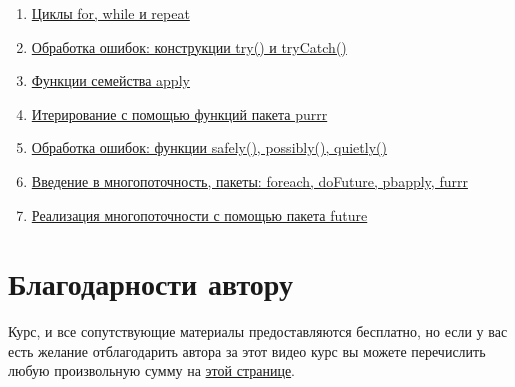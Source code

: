 \documentclass[
]{book}
\providecommand{\tightlist}{%
  \setlength{\itemsep}{0pt}\setlength{\parskip}{0pt}}
\begin{document}
\begin{enumerate}
\def\labelenumi{\arabic{enumi}.}
\tightlist
\item
  \href{\%D1\%86\%D0\%B8\%D0\%BA\%D0\%BB\%D1\%8B-for-while-\%D0\%B8-repeat.html\#\%D1\%86\%D0\%B8\%D0\%BA\%D0\%BB\%D1\%8B-for-while-\%D0\%B8-repeat}{Циклы for, while и repeat}
\item
  \href{обработка-ошибок-конструкции-try-и-trycatch.html}{Обработка ошибок: конструкции try() и tryCatch()}
\item
  \href{\%D1\%84\%D1\%83\%D0\%BD\%D0\%BA\%D1\%86\%D0\%B8\%D0\%B8-\%D1\%81\%D0\%B5\%D0\%BC\%D0\%B5\%D0\%B9\%D1\%81\%D1\%82\%D0\%B2\%D0\%B0-apply.html\#\%D1\%84\%D1\%83\%D0\%BD\%D0\%BA\%D1\%86\%D0\%B8\%D0\%B8-\%D1\%81\%D0\%B5\%D0\%BC\%D0\%B5\%D0\%B9\%D1\%81\%D1\%82\%D0\%B2\%D0\%B0-apply}{Функции семейства apply}
\item
  \href{\%D0\%BF\%D0\%B0\%D0\%BA\%D0\%B5\%D1\%82-purrr.html\#\%D0\%BF\%D0\%B0\%D0\%BA\%D0\%B5\%D1\%82-purrr}{Итерирование с помощью функций пакета purrr}
\item
  \href{обработка-ошибок-функции-safely-possibly-quietly.html}{Обработка ошибок: функции safely(), possibly(), quietly()}
\item
  \href{\%D0\%BC\%D0\%BD\%D0\%BE\%D0\%B3\%D0\%BE\%D0\%BF\%D0\%BE\%D1\%82\%D0\%BE\%D1\%87\%D0\%BD\%D0\%BE\%D1\%81\%D1\%82\%D1\%8C-\%D0\%B2-r.html\#\%D0\%BC\%D0\%BD\%D0\%BE\%D0\%B3\%D0\%BE\%D0\%BF\%D0\%BE\%D1\%82\%D0\%BE\%D1\%87\%D0\%BD\%D0\%BE\%D1\%81\%D1\%82\%D1\%8C-\%D0\%B2-r}{Введение в многопоточность, пакеты: foreach, doFuture, pbapply, furrr}
\item
  \href{\%D0\%BF\%D0\%B0\%D0\%BA\%D0\%B5\%D1\%82-future.html\#\%D0\%BF\%D0\%B0\%D0\%BA\%D0\%B5\%D1\%82-future}{Реализация многопоточности с помощью пакета future}
\end{enumerate}

\hypertarget{ux431ux43bux430ux433ux43eux434ux430ux440ux43dux43eux441ux442ux438-ux430ux432ux442ux43eux440ux443}{%
\section*{Благодарности автору}\label{ux431ux43bux430ux433ux43eux434ux430ux440ux43dux43eux441ux442ux438-ux430ux432ux442ux43eux440ux443}}

Курс, и все сопутствующие материалы предоставляются бесплатно, но если у вас есть желание отблагодарить автора за этот видео курс вы можете перечислить любую произвольную сумму на \href{https://secure.wayforpay.com/payment/r4excel_users}{этой странице}.
\end{document}
